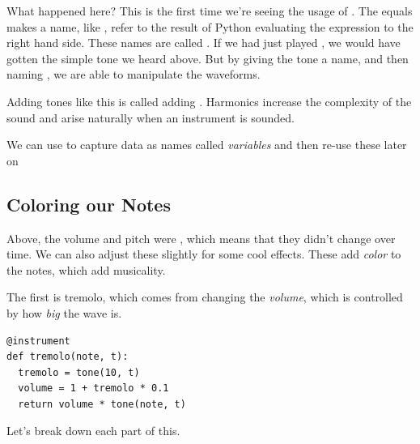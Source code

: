 What happened here? This is the first time we're seeing the usage of \code{=}. The equals makes a
name, like , refer to the result of Python evaluating the expression to the right hand
side. These names are called . If we had just played , we would have gotten
the simple tone we heard above. But by giving the tone a name, and then naming , we are able
to manipulate the waveforms.

Adding tones like this is called adding . Harmonics increase the complexity of the
sound and arise naturally when an instrument is sounded.

\begin{BigIdeaBox}
We can use \code{=} to capture data as names called \emph{variables} and then re-use these later on
\end{BigIdeaBox}

\subsection{Coloring our Notes}
\label{subsec:coloring-our-notes}

Above, the volume and pitch were , which means that they didn't change over time. We
can also adjust these slightly for some cool effects. These add \emph{color} to the notes, which add
musicality.

The first is tremolo, which comes from changing the \emph{volume}, which is controlled by how
\emph{big} the wave is.

\begin{TryThisBox}
  \begin{lstlisting}
@instrument
def tremolo(note, t):
  tremolo = tone(10, t)
  volume = 1 + tremolo * 0.1
  return volume * tone(note, t)
  \end{lstlisting}
\end{TryThisBox}

Let's break down each part of this.


